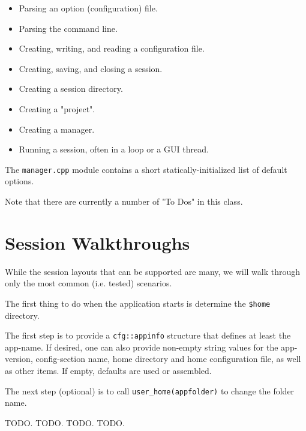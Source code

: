    \begin{itemize}
      \item Parsing an option (configuration) file.
      \item Parsing the command line.
      \item Creating, writing, and reading a configuration file.
      \item Creating, saving, and closing a session.
      \item Creating a session directory.
      \item Creating a "project".
      \item Creating a manager.
      \item Running a session, often in a loop or a GUI thread.
   \end{itemize}
   
   The \texttt{manager.cpp} module contains a short
   statically-initialized list of
   default options.

   Note that there are currently a number of "To Dos" in this class.

\section{Session Walkthroughs}
\label{sec:session_walkthroughs}

	While the session layouts that can be supported are many, we will
	walk through only the most common (i.e. tested) scenarios.

   The first thing to do when the application starts is determine
   the \texttt{\$home} directory.

   The first step is to provide a \texttt{cfg::appinfo} structure
   that defines at least the app-name.
   If desired, one can also provide non-empty string values for
   the app-version, config-section name, home directory and home
   configuration file, as well as other items. If empty, defaults
   are used or assembled.

   The next step (optional) is to call \texttt{user\_home(appfolder)}
   to change the folder name.

   TODO.
   TODO.
   TODO.
   TODO.

